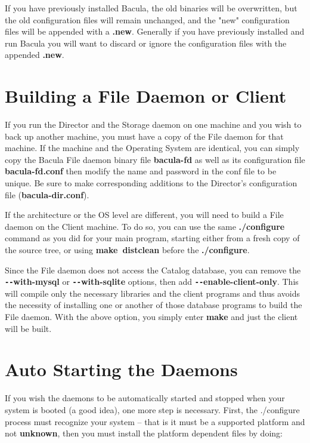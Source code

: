 If you have previously installed Bacula, the old binaries will be overwritten,
but the old configuration files will remain unchanged, and the "new"
configuration files will be appended with a {\bf .new}. Generally if you have
previously installed and run Bacula you will want to discard or ignore the
configuration files with the appended {\bf .new}. 

\section{Building a File Daemon or Client}

If you run the Director and the Storage daemon on one machine and you wish to
back up another machine, you must have a copy of the File daemon for that
machine. If the machine and the Operating System are identical, you can simply
copy the Bacula File daemon binary file {\bf bacula-fd} as well as its
configuration file {\bf bacula-fd.conf} then modify the name and password in
the conf file to be unique. Be sure to make corresponding additions to the
Director's configuration file ({\bf bacula-dir.conf}). 

If the architecture or the OS level are different, you will need to build a
File daemon on the Client machine. To do so, you can use the same {\bf
./configure} command as you did for your main program, starting either from a
fresh copy of the source tree, or using {\bf make\ distclean} before the {\bf
./configure}. 

Since the File daemon does not access the Catalog database, you can remove
the {\bf \verb:--:with-mysql} or {\bf \verb:--:with-sqlite} options, then
add {\bf \verb:--:enable-client-only}.  This will compile only the
necessary libraries and the client programs and thus avoids the necessity
of installing one or another of those database programs to build the File
daemon.  With the above option, you simply enter {\bf make} and just the
client will be built.

\label{autostart}
\section{Auto Starting the Daemons}

If you wish the daemons to be automatically started and stopped when your
system is booted (a good idea), one more step is necessary. First, the
./configure process must recognize your system -- that is it must be a
supported platform and not {\bf unknown}, then you must install the platform
dependent files by doing: 

